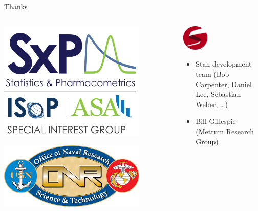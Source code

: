 \documentclass[bigger]{beamer}
\begin{document}
\begin{frame}[label={sec:orgca49112}]{Thanks}
\begin{columns}
\begin{column}{0.5\columnwidth}
\begin{center}
\includegraphics[width=0.8\textwidth]{./figure/sxplogo.png}
\end{center}
\begin{center}
\includegraphics[width=0.8\textwidth]{./figure/onr_logo.png}
\end{center}
\end{column}

\begin{column}{0.5\columnwidth}
\begin{center}
\includegraphics[width=0.3\textwidth]{./figure/stan_logo.png}
\end{center}

\begin{itemize}
\item Stan development team (Bob Carpenter, Daniel Lee, Sebastian Weber, \ldots{})
\item Bill Gillespie (Metrum Research Group)
\end{itemize}
\end{column}
\end{columns}
\end{frame}
\end{document}
